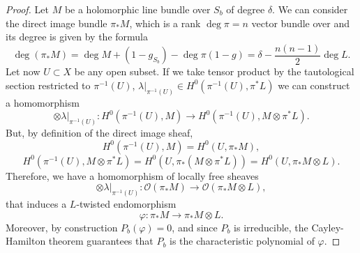 \documentclass[12pt,a4paper]{book}
\theoremstyle{definition} \newtheorem{defn}[thm]{Definition}
\theoremstyle{definition} \newtheorem{ejemplo}[thm]{Example}
\theoremstyle{remark} \newtheorem{rem}[thm]{Remark}
\def\OO{\mathscr{O}}
\begin{document}
	\begin{proof}
	  Let $M$ be a holomorphic line bundle over $S_b$ of degree $\delta$. We can consider the direct image bundle $\pi_*M$, which is a rank $\deg \pi=n$ vector bundle over and its degree is given by the formula
	  \begin{equation*}
	    \deg(\pi_*M)=\deg M + (1-g_{S_b}) - \deg \pi (1-g)=\delta -  \frac{n(n-1)}{2}\deg L.
	  \end{equation*}
	  Let now $U\subset X$ be any open subset. If we take tensor product by the tautological section restricted to $\pi^{-1}(U)$, $\lambda|_{\pi^{-1}(U)} \in H^0(\pi^{-1}(U),\pi^*L)$ we can construct a homomorphism
	  \begin{equation*}
	    \otimes \lambda|_{\pi^{-1}(U)}: H^0(\pi^{-1}(U),M) \rightarrow H^0(\pi^{-1}(U),M \otimes \pi^*L).
	  \end{equation*}
	  But, by definition of the direct image sheaf,
	  \begin{equation*}
	    H^0(\pi^{-1}(U),M)=H^0(U,\pi_*M),
	  \end{equation*}
	  \begin{equation*}
	    H^0(\pi^{-1}(U),M\otimes \pi^{*}L)=H^0(U,\pi_*(M\otimes \pi^*L))=H^0(U,\pi_*M \otimes L).
	  \end{equation*}
	  Therefore, we have a homomorphism of locally free sheaves
	  \begin{equation*}
	     \otimes \lambda|_{\pi^{-1}(U)}: \OO(\pi_*M) \rightarrow \OO(\pi_*M \otimes L),
	  \end{equation*}
	  that induces a $L$-twisted endomorphism
	  \begin{equation*}
	    \varphi:\pi_*M \rightarrow \pi_*M\otimes L.
	  \end{equation*}
	  Moreover, by construction $P_b(\varphi)=0$, and since $P_b$ is irreducible, the Cayley-Hamilton theorem guarantees that $P_b$ is the characteristic polynomial of $\varphi$.


\end{proof}
\end{document}
